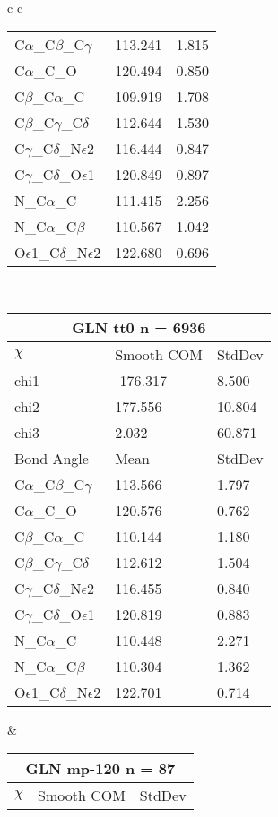 \begin{longtable}{ c c }
\begin{tabular}{ l l l }
  C$\alpha$\_C$\beta$\_C$\gamma$ & 113.241 & 1.815\\
  C$\alpha$\_C\_O & 120.494 & 0.850\\
  C$\beta$\_C$\alpha$\_C & 109.919 & 1.708\\
  C$\beta$\_C$\gamma$\_C$\delta$ & 112.644 & 1.530\\
  C$\gamma$\_C$\delta$\_N$\epsilon$2 & 116.444 & 0.847\\
  C$\gamma$\_C$\delta$\_O$\epsilon$1 & 120.849 & 0.897\\
  N\_C$\alpha$\_C & 111.415 & 2.256\\
  N\_C$\alpha$\_C$\beta$ & 110.567 & 1.042\\
  O$\epsilon$1\_C$\delta$\_N$\epsilon$2 & 122.680 & 0.696\\
  \bottomrule
  \end{tabular}
  \\
  \begin{tabular}{ l l l }
  \toprule
  \multicolumn{3}{c}{GLN \textbf{tt0} n = 6936} \\ \toprule
  $\chi$       & Smooth COM & StdDev \\ \midrule
  chi1 & -176.317 & 8.500 \\ 
  chi2 & 177.556 & 10.804 \\ 
  chi3 & 2.032 & 60.871 \\ \midrule
  Bond Angle   & Mean     & StdDev \\ \midrule
  C$\alpha$\_C$\beta$\_C$\gamma$ & 113.566 & 1.797\\
  C$\alpha$\_C\_O & 120.576 & 0.762\\
  C$\beta$\_C$\alpha$\_C & 110.144 & 1.180\\
  C$\beta$\_C$\gamma$\_C$\delta$ & 112.612 & 1.504\\
  C$\gamma$\_C$\delta$\_N$\epsilon$2 & 116.455 & 0.840\\
  C$\gamma$\_C$\delta$\_O$\epsilon$1 & 120.819 & 0.883\\
  N\_C$\alpha$\_C & 110.448 & 2.271\\
  N\_C$\alpha$\_C$\beta$ & 110.304 & 1.362\\
  O$\epsilon$1\_C$\delta$\_N$\epsilon$2 & 122.701 & 0.714\\
  \bottomrule
  \end{tabular}
  &
  \begin{tabular}{ l l l }
  \toprule
  \multicolumn{3}{c}{GLN \textbf{mp-120} n = 87} \\ \toprule
  $\chi$       & Smooth COM & StdDev \\ \midrule

\end{tabular}
\end{longtable}
